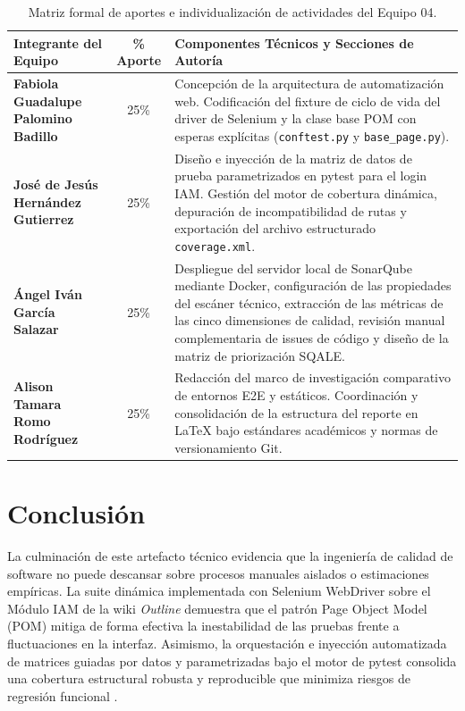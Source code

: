 \documentclass[12pt,oneside]{report}
\begin{document}
\begin{table}[H]
\centering
\caption{Matriz formal de aportes e individualización de actividades del Equipo 04.}
\small
\begin{tabularx}{\textwidth}{|p{4.2cm}|c|X|}
\hline
\textbf{Integrante del Equipo} & \textbf{\% Aporte} & \textbf{Componentes Técnicos y Secciones de Autoría} \\
\hline
\textbf{Fabiola Guadalupe Palomino Badillo} & 25\% & Concepción de la arquitectura de automatización web. Codificación del fixture de ciclo de vida del driver de Selenium y la clase base POM con esperas explícitas (\texttt{conftest.py} y \texttt{base\_page.py}). \\
\hline
\textbf{José de Jesús Hernández Gutierrez} & 25\% & Diseño e inyección de la matriz de datos de prueba parametrizados en pytest para el login IAM. Gestión del motor de cobertura dinámica, depuración de incompatibilidad de rutas y exportación del archivo estructurado \texttt{coverage.xml}. \\
\hline
\textbf{Ángel Iván García Salazar} & 25\% & Despliegue del servidor local de SonarQube mediante Docker, configuración de las propiedades del escáner técnico, extracción de las métricas de las cinco dimensiones de calidad, revisión manual complementaria de issues de código y diseño de la matriz de priorización SQALE. \\
\hline
\textbf{Alison Tamara Romo Rodríguez} & 25\% & Redacción del marco de investigación comparativo de entornos E2E y estáticos. Coordinación y consolidación de la estructura del reporte en LaTeX bajo estándares académicos y normas de versionamiento Git. \\
\hline
\end{tabularx}
\end{table}

\chapter*{Conclusión}

La culminación de este artefacto técnico evidencia que la ingeniería de calidad de software no puede descansar sobre procesos manuales aislados o estimaciones empíricas. La suite dinámica implementada con Selenium WebDriver sobre el Módulo IAM de la wiki \textit{Outline} demuestra que el patrón Page Object Model (POM) mitiga de forma efectiva la inestabilidad de las pruebas frente a fluctuaciones en la interfaz. Asimismo, la orquestación e inyección automatizada de matrices guiadas por datos y parametrizadas bajo el motor de pytest consolida una cobertura estructural robusta y reproducible que minimiza riesgos de regresión funcional \parencite{jorgensen2022}.
\end{document}

